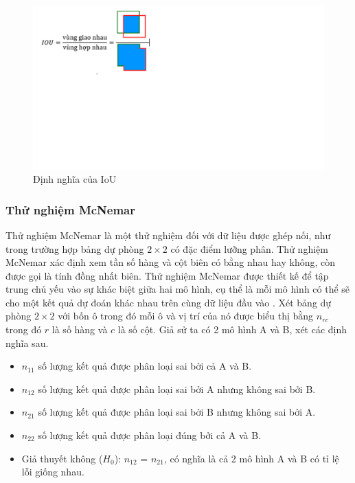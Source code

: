 \documentclass[../the.tex]{subfiles}
\begin{document}
\begin{figure}[ht!]
\centering
	\includegraphics[width=1\textwidth]{images/IoU.PNG}
	\caption{Định nghĩa của IoU}
	\label{fig:IoU}
\end{figure}

\subsubsection*{Thử nghiệm McNemar}

Thử nghiệm McNemar \cite{McNemar1947} là một thử nghiệm đối với dữ liệu được ghép nối, như trong trường hợp bảng dự phòng $2 \times 2$ có đặc điểm lưỡng phân. Thử nghiệm McNemar xác định xem tần số hàng và cột biên có bằng nhau hay không, còn được gọi là tính đồng nhất biên. Thử nghiệm McNemar được thiết kế để tập trung chủ yếu vào sự khác biệt giữa hai mô hình, cụ thể là mỗi mô hình có thể sẽ cho một kết quả dự đoán khác nhau trên cùng dữ liệu đầu vào . Xét bảng dự phòng $2 \times 2$ với bốn ô trong đó mỗi ô và vị trí của nó được biểu thị bằng $n_{rc}$ trong đó $r$ là số hàng và $c$ là số cột. Giả sử ta có 2 mô hình A và B, xét các định nghĩa sau.

\begin {itemize}
  \item $n_{11}$ số lượng kết quả được phân loại sai bởi cả A và B.
  \item $n_{12}$ số lượng kết quả được phân loại sai bởi A nhưng không sai bởi B.
  \item $n_{21}$ số lượng kết quả được phân loại sai bởi B nhưng không sai bởi A.
  \item $n_{22}$ số lượng kết quả được phân loại đúng bởi cả A và B.
  \item Giả thuyết không ($H_0$): $n_{12}$ = $n_{21}$, có nghĩa là cả 2 mô hình A và B có tỉ lệ lỗi giống nhau.
\end {itemize}
\end{document}
